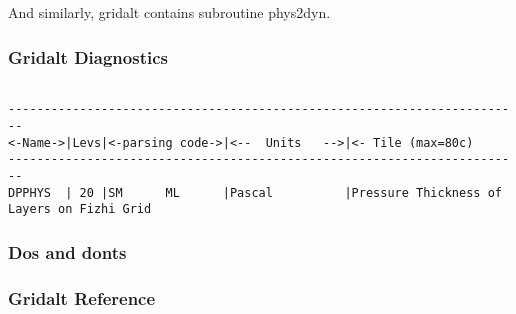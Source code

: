 \noindent And similarly, gridalt contains subroutine phys2dyn.

\subsubsection {Gridalt Diagnostics}
\label{sec:pkg:gridalt:diagnostics}

\begin{verbatim}

------------------------------------------------------------------------
<-Name->|Levs|<-parsing code->|<--  Units   -->|<- Tile (max=80c) 
------------------------------------------------------------------------
DPPHYS  | 20 |SM      ML      |Pascal          |Pressure Thickness of Layers on Fizhi Grid
\end{verbatim}


\subsubsection {Dos and donts}

\subsubsection {Gridalt Reference} 
